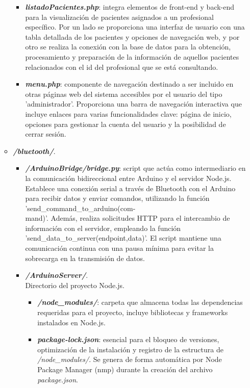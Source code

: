 \begin{itemize}
\begin{itemize}
\begin{itemize}
            \item \textbf{\textit{listadoPacientes.php}}: integra elementos de front-end y back-end para la visualización de pacientes asignados a un profesional específico. Por un lado se proporciona una interfaz de usuario con una tabla detallada de los pacientes y opciones de navegación web, y por otro se realiza la conexión con la base de datos para la obtención, procesamiento y preparación de la información de aquellos pacientes relacionados con el id del profesional que se está consultando.
            \item \textbf{\textit{menu.php}}: componente de navegación destinado a ser incluido en otras páginas web del sistema accesibles por el usuario del tipo 'administrador'. Proporciona una barra de navegación interactiva que incluye enlaces para varias funcionalidades clave: página de inicio, opciones para gestionar la cuenta del usuario y la posibilidad de cerrar sesión.
        \end{itemize}
        \item \textbf{\textit{/bluetooth/}}.
        \begin{itemize}
            \item \textbf{\textit{/ArduinoBridge/bridge.py}}: script que actúa como intermediario en la comunicación bidireccional entre Arduino y el servidor Node.js. Establece una conexión serial a través de Bluetooth con el Arduino para recibir datos y enviar comandos, utilizando la función 'send\_command\_to\_arduino(com-\\mand)'. Además, realiza solicitudes HTTP para el intercambio de información con el servidor, empleando la función 'send\_data\_to\_server(endpoint,data)'. El script mantiene una comunicación continua con una pausa mínima para evitar la sobrecarga en la transmisión de datos.
            \item \textbf{\textit{/ArduinoServer/}}.\\
            Directorio del proyecto Node.js.
            \begin{itemize}
                \item \textbf{\textit{/node\_modules/}}: carpeta que almacena todas las dependencias requeridas para el proyecto, incluye bibliotecas y frameworks instalados en Node.js.
                \item \textbf{\textit{package-lock.json}}: esencial para el bloqueo de versiones, optimización de la instalación y registro de la estructura de \textit{/node\_modules/}. Se genera de forma automática por Node Package Manager (nmp) durante la creación del archivo \textit{package.json}.

\end{itemize}
\end{itemize}
\end{itemize}
\end{itemize}
